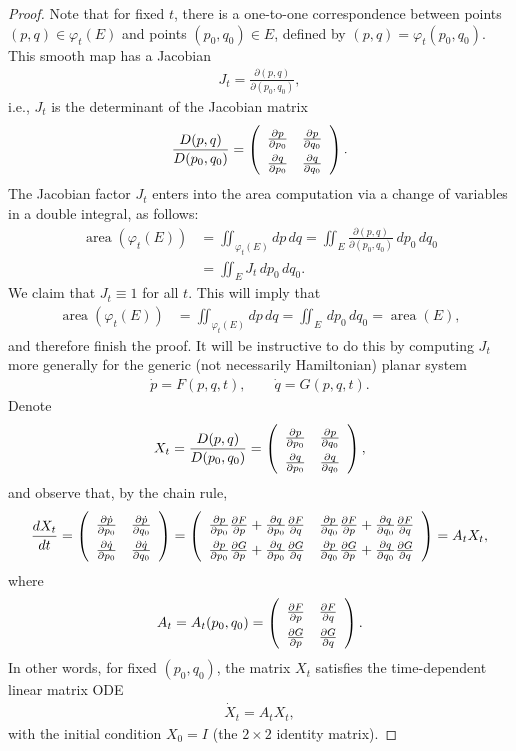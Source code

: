 \documentclass[12pt]{amsart}
\newcommand{\eqst}[1]{\begin{align*}#1\end{align*}}
\newcommand{\der}[2]{\frac{d#1}{d#2}}
\newcommand{\pder}[2]{\frac{\partial#1}{\partial#2}}
\begin{document}
\begin{proof}
Note that for fixed $t$, there is a one-to-one correspondence between points $(p,q) \in \varphi_t(E)$ and points $(p_0,q_0)\in E$, defined by $(p,q)=\varphi_t(p_0,q_0)$. This smooth map has a Jacobian
\eqst{
J_t = \pder{(p,q)}{(p_0,q_0)},
}
i.e., $J_t$ is the determinant of the Jacobian matrix 
\eqst{
\renewcommand{\arraystretch}{1.5}
\frac{D(p,q)}{D(p_0,q_0)} = \left(\begin{array}{cc}
\pder{p}{p_0} & \pder{p}{q_0} \\ \pder{q}{p_0} & \pder{q}{q_0}
\end{array}\right).
}
The Jacobian factor $J_t$ enters into the area computation via a change of variables in a double integral, as follows:
\eqst{
\operatorname{area}(\varphi_t(E)) &= \iint_{\varphi_t(E)} dp\,dq 
= \iint_E \pder{(p,q)}{(p_0,q_0)}\,dp_0\,dq_0
\\ &= \iint_E J_t \,dp_0\,dq_0.
}
We claim that $J_t\equiv 1$ for all $t$. This will imply that
\eqst{
\operatorname{area}(\varphi_t(E)) &= \iint_{\varphi_t(E)} dp\,dq 
= \iint_E \,dp_0\,dq_0 = \operatorname{area}(E),
}
and therefore finish the proof. It will be instructive to do this by computing $J_t$ more generally for the generic (not necessarily Hamiltonian) planar system
\eqst{
\dot{p} = F(p,q,t), \qquad
\dot{q} = G(p,q,t).
}
Denote 
\eqst{
\renewcommand{\arraystretch}{1.5}
X_t = \frac{D(p,q)}{D(p_0,q_0)} = \left(\begin{array}{cc}
\pder{p}{p_0} & \pder{p}{q_0} \\ \pder{q}{p_0} & \pder{q}{q_0}
\end{array}\right),
}
and observe that, by the chain rule,
\eqst{
\der{X_t}{t} = 
\renewcommand{\arraystretch}{1.5}
\left(\begin{array}{cc}
\pder{\dot{p}}{p_0} & \pder{\dot{p}}{q_0} \\ \pder{\dot{q}}{p_0} & \pder{\dot{q}}{q_0}
\end{array}\right) =
\left(\begin{array}{cc}
\pder{p}{p_0} \pder{F}{p} + \pder{q}{p_0} \pder{F}{q} & \pder{p}{q_0} \pder{F}{p} + \pder{q}{q_0} \pder{F}{q} \\
\pder{p}{p_0} \pder{G}{p} + \pder{q}{p_0} \pder{G}{q} & \pder{p}{q_0} \pder{G}{p} + \pder{q}{q_0} \pder{G}{q}
\end{array}\right)
 = A_t X_t,
}
where
\eqst{
\renewcommand{\arraystretch}{1.5}
A_t = A_t(p_0,q_0) = \left(\begin{array}{cc} \pder{F}{p} & \pder{F}{q} \\ \pder{G}{p} & \pder{G}{q} \end{array}\right).
}
In other words, for fixed $(p_0,q_0)$, the matrix $X_t$ satisfies the time-dependent linear matrix ODE 
\eqst{ \dot{X}_t = A_t X_t, }
with the initial condition $X_0 = I$ (the $2\times2$ identity matrix).


\end{proof}
\end{document}
